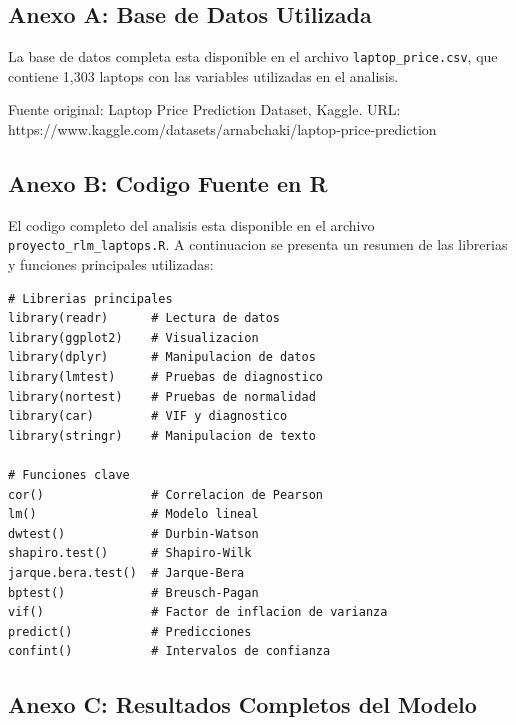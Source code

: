 \documentclass[12pt,a4paper]{article}
\begin{document}
\subsection{Anexo A: Base de Datos Utilizada}

La base de datos completa esta disponible en el archivo \texttt{laptop\_price.csv}, que contiene 1,303 laptops con las variables utilizadas en el analisis.

Fuente original: Laptop Price Prediction Dataset, Kaggle.
URL: https://www.kaggle.com/datasets/arnabchaki/laptop-price-prediction

\subsection{Anexo B: Codigo Fuente en R}

El codigo completo del analisis esta disponible en el archivo \texttt{proyecto\_rlm\_laptops.R}. A continuacion se presenta un resumen de las librerias y funciones principales utilizadas:

\begin{verbatim}
# Librerias principales
library(readr)      # Lectura de datos
library(ggplot2)    # Visualizacion
library(dplyr)      # Manipulacion de datos
library(lmtest)     # Pruebas de diagnostico
library(nortest)    # Pruebas de normalidad
library(car)        # VIF y diagnostico
library(stringr)    # Manipulacion de texto

# Funciones clave
cor()               # Correlacion de Pearson
lm()                # Modelo lineal
dwtest()            # Durbin-Watson
shapiro.test()      # Shapiro-Wilk
jarque.bera.test()  # Jarque-Bera
bptest()            # Breusch-Pagan
vif()               # Factor de inflacion de varianza
predict()           # Predicciones
confint()           # Intervalos de confianza
\end{verbatim}

\subsection{Anexo C: Resultados Completos del Modelo}
\end{document}
